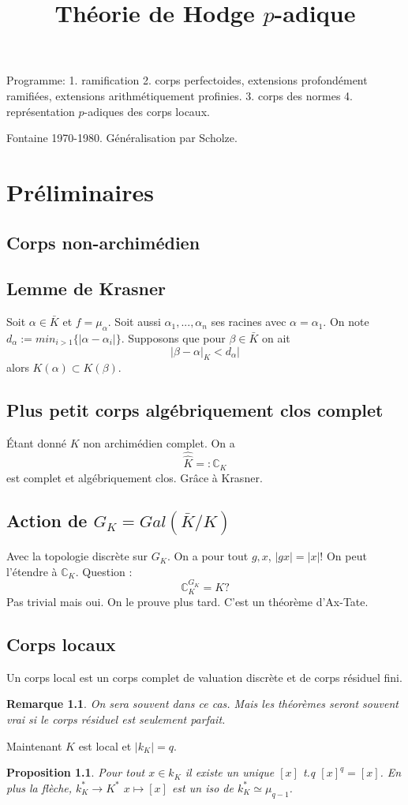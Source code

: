 \documentclass[a4paper,12pt]{book}
\title{Théorie de Hodge $p$-adique}
\date{}
\newcommand{\C}{\mathbb{C}}
\theoremstyle{plain}
\newtheorem{prop}{Proposition}
\newtheorem{rem}{Remarque}
\theoremstyle{definition}
\theoremstyle{remark}
\begin{document}
\maketitle
Programme: 1. ramification 2. corps perfectoides, extensions
profondément ramifiées, extensions arithmétiquement profinies.
3. corps des normes 4. représentation $p$-adiques des corps locaux.

Fontaine 1970-1980. Généralisation par Scholze.

\chapter{Préliminaires}
\section{Corps non-archimédien}

\section{Lemme de Krasner}
Soit $\alpha\in \bar K$ et $f=\mu_\alpha$. Soit aussi
$\alpha_1,...,\alpha_n$ ses racines avec $\alpha=\alpha_1$.
On note $d_\alpha:=min_{i>1}\{|\alpha-\alpha_i|\}$.
Supposons que pour $\beta\in \bar K$ on ait
\[|\beta-\alpha|_K<d_\alpha|\]
alors $K(\alpha)\subset K(\beta)$.
\section{Plus petit corps algébriquement clos complet}
Étant donné $K$ non archimédien complet. On a
\[\widehat{\hat K}=:\C_K\]
est complet et algébriquement clos. Grâce à Krasner.

\section{Action de $G_K=Gal(\bar K/K)$}
Avec la topologie discrète sur $G_K$. On a
pour tout $g,x$, $|gx|=|x|$!
On peut l'étendre à $\C_K$. Question :
\[\C_K^{G_K}=K?\]
Pas trivial mais oui. On le prouve plus tard.
C'est un théorème d'Ax-Tate.

\section{Corps locaux}
Un corps local est un corps complet de valuation
discrète et de corps résiduel fini.
\begin{rem}
    On sera souvent dans ce cas. Mais les théorèmes
    seront souvent vrai si le corps résiduel est seulement
    parfait.
\end{rem}
Maintenant $K$ est local et $|k_K|=q$.
\begin{prop}
    Pour tout $x\in k_K$ il existe un unique $[x]$
    t.q $[x]^q=[x]$. En plus la flèche, $k_K^*\to K^*$
    $x\mapsto [x]$ est un iso de $k_K^*\simeq \mu_{q-1}$.
\end{prop}
\end{document}
